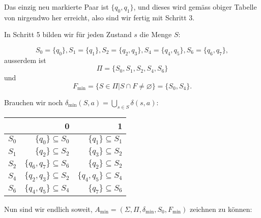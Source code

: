 \documentclass[11pt]{article} %
\theoremstyle{definition}
\begin{document}
Das einzig neu markierte Paar ist $\{q_0, q_1\}$, und dieses wird gemäss obiger Tabelle von nirgendwo her erreicht, also sind wir fertig mit Schritt 3.

In Schritt 5 bilden wir für jeden Zustand $s$ die Menge $S$:

\[
S_0 = \{q_0\}, S_1 = \{q_1\}, S_2 = \{q_2, q_3\}, S_4 = \{q_4, q_5\}, S_6 = \{q_6,q_7\},
\] ausserdem ist
\[
\Pi = \{S_0, S_1, S_2, S_4, S_6\}
\]
und
\[
F_\textrm{min} = \{ S \in \Pi | S \cap F \ne \varnothing \} = \{ S_0, S_4\}.
\]

Brauchen wir noch $\delta_\textrm{min}(S, a) = \bigcup\limits_{s \in S} \delta(s, a)$:

\begin{center}
\begin{tabular}{rrr}
\toprule
      & 0     & 1 \\
\midrule
$S_0$ & $\{q_0 \} \subseteq S_0$ & $\{q_1 \} \subseteq S_1$ \\
$S_1$ & $\{q_2 \} \subseteq S_2$ & $\{q_3 \} \subseteq S_2$ \\
$S_2$ & $\{q_6, q_7 \} \subseteq S_6$ & $\{q_2 \} \subseteq S_2$ \\
$S_4$ & $\{q_2, q_3 \} \subseteq S_2$ & $\{q_4, q_5 \} \subseteq S_4$ \\
$S_6$ & $\{q_4, q_5 \} \subseteq S_4$ & $\{q_7 \} \subseteq S_6$ \\
\bottomrule
\end{tabular}%
\end{center}

Nun sind wir endlich soweit, $A_\textrm{min} = (\Sigma, \Pi, \delta_\textrm{min}, S_0, F_\textrm{min})$ zeichnen zu können:
\end{document}
